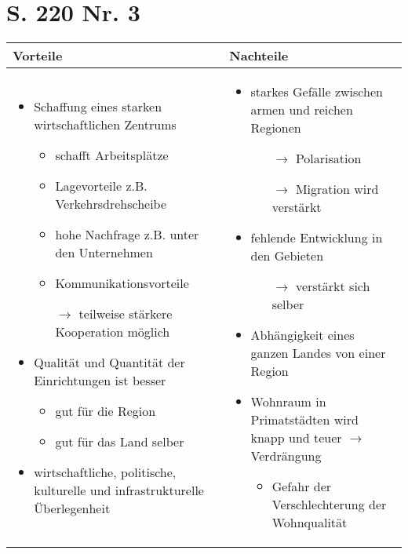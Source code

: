 \documentclass[12pt,a4paper]{report}
\begin{document}
	\section{S. 220 Nr. 3}
	\begin{tabularx}{\textwidth}{|X|X|}
		\hline
		\textbf{Vorteile} & \textbf{Nachteile} \\
		\hline
		\begin{itemize}
			\item Schaffung eines starken wirtschaftlichen Zentrums
			\begin{itemize}
				\item schafft Arbeitsplätze
				\item Lagevorteile z.B. Verkehrsdrehscheibe
				\item hohe Nachfrage z.B. unter den Unternehmen
				\item Kommunikationsvorteile
				\item[$\to$] teilweise stärkere Kooperation möglich
			\end{itemize}
			\item Qualität und Quantität der Einrichtungen ist besser
			\begin{itemize}
				\item gut für die Region
				\item gut für das Land selber
			\end{itemize}
			\item wirtschaftliche, politische, kulturelle und infrastrukturelle Überlegenheit
		\end{itemize}
		&
		\begin{itemize}
			\item starkes Gefälle zwischen armen und reichen Regionen
			\begin{itemize}
				\item[$\to$] Polarisation
				\item[$\to$] Migration wird verstärkt
			\end{itemize}
			\item fehlende Entwicklung in den Gebieten
			\begin{itemize}
				\item[$\to$] verstärkt sich selber
			\end{itemize}
			\item Abhängigkeit eines ganzen Landes von einer Region
			\item Wohnraum in Primatstädten wird knapp und teuer $\to$ Verdrängung
			\begin{itemize}
				\item Gefahr der Verschlechterung der Wohnqualität
			\end{itemize}
		\end{itemize}
		\\
		\hline
	\end{tabularx}
\end{document}
